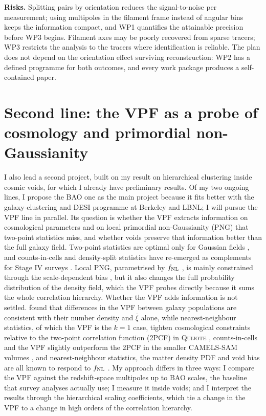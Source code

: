 \documentclass[11pt,a4paper]{article}
\begin{document}
\textbf{Risks.} Splitting pairs by orientation reduces the signal-to-noise per measurement; using multipoles in the filament frame instead of angular bins keeps the information compact, and WP1 quantifies the attainable precision before WP3 begins. Filament axes may be poorly recovered from sparse tracers; WP3 restricts the analysis to the tracers where identification is reliable. The plan does not depend on the orientation effect surviving reconstruction: WP2 has a defined programme for both outcomes, and every work package produces a self-contained paper.

\section*{Second line: the VPF as a probe of cosmology and primordial non-Gaussianity}

I also lead a second project, built on my result on hierarchical clustering inside cosmic voids, for which I already have preliminary results. Of my two ongoing lines, I propose the BAO one as the main project because it fits better with the galaxy-clustering and DESI programme at Berkeley and LBNL; I will pursue the VPF line in parallel. Its question is whether the VPF extracts information on cosmological parameters and on local primordial non-Gaussianity (PNG) that two-point statistics miss, and whether voids preserve that information better than the full galaxy field. Two-point statistics are optimal only for Gaussian fields \citep{Carron2013}, and counts-in-cells and density-split statistics have re-emerged as complements for Stage IV surveys \citep{Uhlemann2020,Paillas2023}. Local PNG, parametrised by $f_{\rm NL}$ \citep{Komatsu2001}, is mainly constrained through the scale-dependent bias \citep{Dalal2008}, but it also changes the full probability distribution of the density field, which the VPF probes directly because it sums the whole correlation hierarchy. Whether the VPF adds information is not settled. \citet{Conroy2005} found that differences in the VPF between galaxy populations are consistent with their number density and $\bar\xi$ alone, while nearest-neighbour statistics, of which the VPF is the $k=1$ case, tighten cosmological constraints relative to the two-point correlation function (2PCF) in \textsc{Quijote} \citep{Banerjee2021}, counts-in-cells and the VPF slightly outperform the 2PCF in the smaller CAMELS-SAM volumes \citep{Perez2023}, and nearest-neighbour statistics, the matter density PDF and void bias are all known to respond to $f_{\rm NL}$ \citep{Coulton2023b,Friedrich2020,Chan2019}. My approach differs in three ways: I compare the VPF against the redshift-space multipoles up to BAO scales, the baseline that survey analyses actually use; I measure it inside voids; and I interpret the results through the hierarchical scaling coefficients, which tie a change in the VPF to a change in high orders of the correlation hierarchy.
\end{document}
